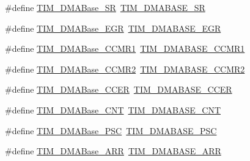 \begin{DoxyCompactItemize}
\item 
\#define \hyperlink{group___h_a_l___t_i_m___aliased___defines_ga5cda07a11a76bbb24a7d5bb680814d31}{T\+I\+M\+\_\+\+D\+M\+A\+Base\+\_\+\+SR}~\hyperlink{group___t_i_m___d_m_a___base__address_gaf0da2213e3e7b6aaaa9b738ec85abc02}{T\+I\+M\+\_\+\+D\+M\+A\+B\+A\+S\+E\+\_\+\+SR}
\item 
\#define \hyperlink{group___h_a_l___t_i_m___aliased___defines_gab5e6f6c3fea100896d13ce317a6ccd8e}{T\+I\+M\+\_\+\+D\+M\+A\+Base\+\_\+\+E\+GR}~\hyperlink{group___t_i_m___d_m_a___base__address_gaff6d230aafb918047d62e877d21b3bdc}{T\+I\+M\+\_\+\+D\+M\+A\+B\+A\+S\+E\+\_\+\+E\+GR}
\item 
\#define \hyperlink{group___h_a_l___t_i_m___aliased___defines_gaab384496cff3e54d8179fc0db727c7ee}{T\+I\+M\+\_\+\+D\+M\+A\+Base\+\_\+\+C\+C\+M\+R1}~\hyperlink{group___t_i_m___d_m_a___base__address_gac94d74bf77d5ce139c7fa6e0b8c2da44}{T\+I\+M\+\_\+\+D\+M\+A\+B\+A\+S\+E\+\_\+\+C\+C\+M\+R1}
\item 
\#define \hyperlink{group___h_a_l___t_i_m___aliased___defines_ga4989f74592ab359f30bd7c4a4a457571}{T\+I\+M\+\_\+\+D\+M\+A\+Base\+\_\+\+C\+C\+M\+R2}~\hyperlink{group___t_i_m___d_m_a___base__address_ga94f3dcf13674f397fee0ef816ad973cf}{T\+I\+M\+\_\+\+D\+M\+A\+B\+A\+S\+E\+\_\+\+C\+C\+M\+R2}
\item 
\#define \hyperlink{group___h_a_l___t_i_m___aliased___defines_ga6935639db5738662520e8d0eb7116dd6}{T\+I\+M\+\_\+\+D\+M\+A\+Base\+\_\+\+C\+C\+ER}~\hyperlink{group___t_i_m___d_m_a___base__address_ga64cb24a6d9d96d950be64586923c7447}{T\+I\+M\+\_\+\+D\+M\+A\+B\+A\+S\+E\+\_\+\+C\+C\+ER}
\item 
\#define \hyperlink{group___h_a_l___t_i_m___aliased___defines_gacab604257d144cf3a59b360cbc958ec9}{T\+I\+M\+\_\+\+D\+M\+A\+Base\+\_\+\+C\+NT}~\hyperlink{group___t_i_m___d_m_a___base__address_gae711483dbf4f0eafb2505b8f823c4724}{T\+I\+M\+\_\+\+D\+M\+A\+B\+A\+S\+E\+\_\+\+C\+NT}
\item 
\#define \hyperlink{group___h_a_l___t_i_m___aliased___defines_gab8dd06970f235fe9f6997e0975237388}{T\+I\+M\+\_\+\+D\+M\+A\+Base\+\_\+\+P\+SC}~\hyperlink{group___t_i_m___d_m_a___base__address_gae23315a3ef1af7dccfbbfada90355bd8}{T\+I\+M\+\_\+\+D\+M\+A\+B\+A\+S\+E\+\_\+\+P\+SC}
\item 
\#define \hyperlink{group___h_a_l___t_i_m___aliased___defines_gaab8a66f70e59b5916b4bba344746d652}{T\+I\+M\+\_\+\+D\+M\+A\+Base\+\_\+\+A\+RR}~\hyperlink{group___t_i_m___d_m_a___base__address_ga3e08cd689d59f76dd5ca958a0ffdfb3d}{T\+I\+M\+\_\+\+D\+M\+A\+B\+A\+S\+E\+\_\+\+A\+RR}

\end{DoxyCompactItemize}
